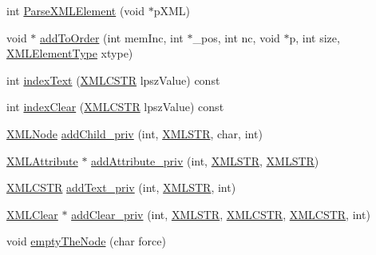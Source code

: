 \begin{DoxyCompactItemize}
int \hyperlink{structXMLNode_a79f4910d7336078e4f923e8c187252f8}{Parse\-X\-M\-L\-Element} (void $\ast$p\-X\-M\-L)
\item 
void $\ast$ \hyperlink{structXMLNode_a5094fc1ded22a0999eae8fc9395543d4}{add\-To\-Order} (int mem\-Inc, int $\ast$\-\_\-pos, int nc, void $\ast$p, int size, \hyperlink{xmlParser_8h_a100a496e2b573b37eb4e75f00a316851}{X\-M\-L\-Element\-Type} xtype)
\item 
int \hyperlink{structXMLNode_a982dcacb4020b634d5c8c08a2e2eb917}{index\-Text} (\hyperlink{xmlParser_8h_acdb0d6fd8dd596384b438d86cfb2b182}{X\-M\-L\-C\-S\-T\-R} lpsz\-Value) const 
\item 
int \hyperlink{structXMLNode_ae71e1a7a5e02842a28678d6d12dbab31}{index\-Clear} (\hyperlink{xmlParser_8h_acdb0d6fd8dd596384b438d86cfb2b182}{X\-M\-L\-C\-S\-T\-R} lpsz\-Value) const 
\item 
\hyperlink{structXMLNode}{X\-M\-L\-Node} \hyperlink{structXMLNode_ae6d79fd7b2860409d5e3ba6bc40dd0cf}{add\-Child\-\_\-priv} (int, \hyperlink{xmlParser_8h_a849d96105aa0c8f64b5c10d9151a3cdc}{X\-M\-L\-S\-T\-R}, char, int)
\item 
\hyperlink{structXMLAttribute}{X\-M\-L\-Attribute} $\ast$ \hyperlink{structXMLNode_aae2660e9e0b5dde280a38a210f4f8b39}{add\-Attribute\-\_\-priv} (int, \hyperlink{xmlParser_8h_a849d96105aa0c8f64b5c10d9151a3cdc}{X\-M\-L\-S\-T\-R}, \hyperlink{xmlParser_8h_a849d96105aa0c8f64b5c10d9151a3cdc}{X\-M\-L\-S\-T\-R})
\item 
\hyperlink{xmlParser_8h_acdb0d6fd8dd596384b438d86cfb2b182}{X\-M\-L\-C\-S\-T\-R} \hyperlink{structXMLNode_a2a73c243d97fbc8e80687ade10b67a07}{add\-Text\-\_\-priv} (int, \hyperlink{xmlParser_8h_a849d96105aa0c8f64b5c10d9151a3cdc}{X\-M\-L\-S\-T\-R}, int)
\item 
\hyperlink{structXMLClear}{X\-M\-L\-Clear} $\ast$ \hyperlink{structXMLNode_a76a66a211f07f3bef740375e57a4825a}{add\-Clear\-\_\-priv} (int, \hyperlink{xmlParser_8h_a849d96105aa0c8f64b5c10d9151a3cdc}{X\-M\-L\-S\-T\-R}, \hyperlink{xmlParser_8h_acdb0d6fd8dd596384b438d86cfb2b182}{X\-M\-L\-C\-S\-T\-R}, \hyperlink{xmlParser_8h_acdb0d6fd8dd596384b438d86cfb2b182}{X\-M\-L\-C\-S\-T\-R}, int)
\item 
void \hyperlink{structXMLNode_ad93b2b89fb5df65851b3f6714c3ddc44}{empty\-The\-Node} (char force)
\end{DoxyCompactItemize}
